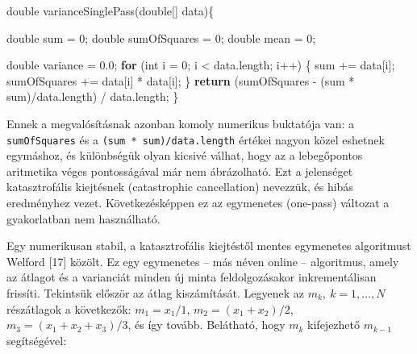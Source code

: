 \documentclass[
]{article}
\newenvironment{Shaded}{}{}
\newcommand{\ControlFlowTok}[1]{\textcolor[rgb]{0.00,0.44,0.13}{\textbf{#1}}}
\newcommand{\DataTypeTok}[1]{\textcolor[rgb]{0.56,0.13,0.00}{#1}}
\newcommand{\DecValTok}[1]{\textcolor[rgb]{0.25,0.63,0.44}{#1}}
\newcommand{\FloatTok}[1]{\textcolor[rgb]{0.25,0.63,0.44}{#1}}
\newcommand{\FunctionTok}[1]{\textcolor[rgb]{0.02,0.16,0.49}{#1}}
\newcommand{\NormalTok}[1]{#1}
\newcommand{\OperatorTok}[1]{\textcolor[rgb]{0.40,0.40,0.40}{#1}}
\begin{document}
\begin{Shaded}
\begin{Highlighting}[]
\DataTypeTok{double} \FunctionTok{varianceSinglePass}\OperatorTok{(}\DataTypeTok{double}\OperatorTok{[]}\NormalTok{ data}\OperatorTok{)\{}

    \DataTypeTok{double}\NormalTok{ sum }\OperatorTok{=} \DecValTok{0}\OperatorTok{;}
    \DataTypeTok{double}\NormalTok{ sumOfSquares }\OperatorTok{=} \DecValTok{0}\OperatorTok{;}
    \DataTypeTok{double}\NormalTok{ mean }\OperatorTok{=} \DecValTok{0}\OperatorTok{;}

    \DataTypeTok{double}\NormalTok{ variance }\OperatorTok{=} \FloatTok{0.0}\OperatorTok{;}
    \ControlFlowTok{for} \OperatorTok{(}\DataTypeTok{int}\NormalTok{ i }\OperatorTok{=} \DecValTok{0}\OperatorTok{;}\NormalTok{ i }\OperatorTok{\textless{}}\NormalTok{ data}\OperatorTok{.}\FunctionTok{length}\OperatorTok{;}\NormalTok{ i}\OperatorTok{++)} \OperatorTok{\{}
\NormalTok{        sum }\OperatorTok{+=}\NormalTok{ data}\OperatorTok{[}\NormalTok{i}\OperatorTok{];}
\NormalTok{        sumOfSquares }\OperatorTok{+=}\NormalTok{ data}\OperatorTok{[}\NormalTok{i}\OperatorTok{]} \OperatorTok{*}\NormalTok{ data}\OperatorTok{[}\NormalTok{i}\OperatorTok{];}
    \OperatorTok{\}}
    \ControlFlowTok{return} \OperatorTok{(}\NormalTok{sumOfSquares }\OperatorTok{{-}} \OperatorTok{(}\NormalTok{sum }\OperatorTok{*}\NormalTok{ sum}\OperatorTok{)/}\NormalTok{data}\OperatorTok{.}\FunctionTok{length}\OperatorTok{)} \OperatorTok{/}\NormalTok{ data}\OperatorTok{.}\FunctionTok{length}\OperatorTok{;}
\OperatorTok{\}}
\end{Highlighting}
\end{Shaded}

Ennek a megvalósításnak azonban komoly numerikus buktatója van: a
\texttt{sumOfSquares} és a \texttt{(sum\ *\ sum)/data.length} értékei
nagyon közel eshetnek egymáshoz, és különbségük olyan kicsivé válhat,
hogy az a lebegőpontos aritmetika véges pontosságával már nem
ábrázolható. Ezt a jelenséget katasztrofális kiejtésnek (catastrophic
cancellation) nevezzük, és hibás eredményhez vezet. Következésképpen ez
az egymenetes (one-pass) változat a gyakorlatban nem használható.

Egy numerikusan stabil, a katasztrofális kiejtéstől mentes egymenetes
algoritmust Welford {[}17{]} közölt. Ez egy egymenetes -- más néven
online -- algoritmus, amely az átlagot és a varianciát minden új minta
feldolgozásakor inkrementálisan frissíti. Tekintsük először az átlag
kiszámítását. Legyenek az \(m_k,\ k = 1, \ldots, N\) részátlagok a
következők: \(m_1 = x_1/1\), \(m_2 = (x_1 + x_2)/2\),
\(m_3 = (x_1 + x_2 + x_3)/3\), és így tovább. Belátható, hogy \(m_k\)
kifejezhető \(m_{k-1}\) segítségével:
\end{document}
